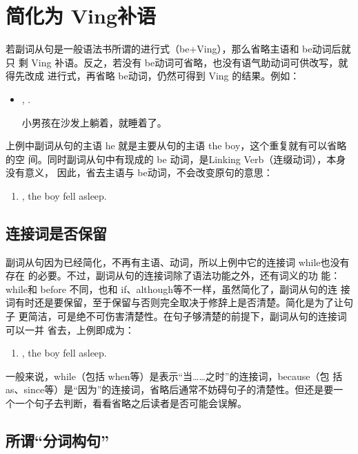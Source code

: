 \section{简化为 Ving补语}

若副词从句是一般语法书所谓的进行式（be+Ving），那么省略主语和 be动词后就只
剩 Ving 补语。反之，若没有 be动词可省略，也没有语气助动词可供改写，就得先改成
进行式，再省略 be动词，仍然可得到 Ving 的结果。例如：

\begin{itemize}
\item {},   .

  小男孩在沙发上躺着，就睡着了。
\end{itemize}
上例中副词从句的主语 he 就是主要从句的主语 the boy，这个重复就有可以省略的空
间。同时副词从句中有现成的 be 动词，是Linking Verb（连缀动词），本身没有意义，
因此，省去主语与 be动词，不会改变原句的意思：
\begin{enumerate}
\item {}, the boy fell asleep.
\end{enumerate}

\subsection{连接词是否保留}

副词从句因为已经简化，不再有主语、动词，所以上例中它的连接词 while也没有存在
的必要。不过，副词从句的连接词除了语法功能之外，还有词义的功
能：while和 before 不同，也和 if、although等不一样，虽然简化了，副词从句的连
接词有时还是要保留，至于保留与否则完全取决于修辞上是否清楚。简化是为了让句子
更简洁，可是绝不可伤害清楚性。在句子够清楚的前提下，副词从句的连接词可以一并
省去，上例即成为：
\begin{enumerate}[resume]
\item {}, the boy fell asleep.
\end{enumerate}

一般来说，while（包括 when等）是表示“当……之时”的连接词，because（包
括 as、since等）是“因为”的连接词，省略后通常不妨碍句子的清楚性。但还是要一
个一个句子去判断，看看省略之后读者是否可能会误解。

\subsection{所谓“分词构句”}

